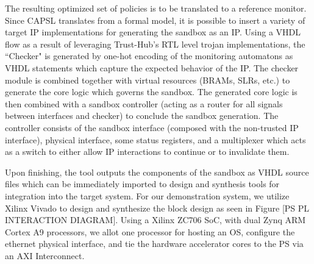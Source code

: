 \documentclass[sigconf]{acmart}
\theoremstyle{plain}
\theoremstyle{remark}
\begin{document}
The resulting optimized set of policies is to be translated to a reference monitor. Since CAPSL translates from a formal model, it is possible to insert a variety of target IP implementations for generating the sandbox as an IP. Using a VHDL flow as a result of leveraging Trust-Hub's RTL level trojan implementations, the ``Checker" is generated by one-hot encoding of the monitoring automatons as VHDL statements which capture the expected behavior of the IP. The checker module is combined together with virtual resources (BRAMs, SLRs, etc.) to generate the core logic which governs the sandbox. The generated core logic is then combined with a sandbox controller (acting as a router for all signals between interfaces and checker) to conclude the sandbox generation. The controller consists of the sandbox interface (composed with the non-trusted IP interface), physical interface, some status registers, and a multiplexer which acts as a switch to either allow IP interactions to continue or to invalidate them.


Upon finishing, the tool outputs the components of the sandbox as VHDL source files which can be immediately imported to design and synthesis tools for integration into the target system. For our demonstration system, we utilize Xilinx Vivado to design and synthesize the block design as seen in Figure [PS PL INTERACTION DIAGRAM]. Using a Xilinx ZC706 SoC, with dual Zynq ARM Cortex A9 processors, we allot one processor for hosting an OS, configure the ethernet physical interface, and tie the hardware accelerator cores to the PS via an AXI Interconnect.
\end{document}
